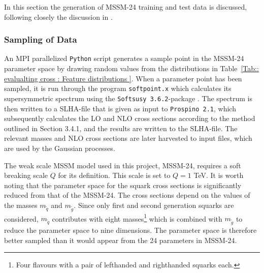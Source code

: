 \documentclass[twoside,english]{uiofysmaster}
\begin{document}
{In this section the generation of MSSM-24 training and test data is discussed, following closely the discussion in \cite{sparre2018fast}. 

\subsubsection{Sampling of Data}

An MPI parallelized \verb|Python| script generates a sample point in the MSSM-24 parameter space by drawing random values from the distributions in Table~\ref{Tab:: evalualting cross : Feature distributions }. When a parameter point has been sampled, it is run through the program \verb|softpoint.x| which calculates its supersymmetric spectrum using the \verb|Softsusy 3.6.2|-package \cite{ALLANACH2002305}. The spectrum is then written to a SLHA-file \cite{skands2004susy} that is given as input to \verb|Prospino 2.1|, which subsequently calculates the LO and NLO cross sections according to the method outlined in Section 3.4.1, and the results are written to the SLHA-file. The relevant masses and NLO cross sections are later harvested to input files, which are used by the Gaussian processes. 

The weak scale MSSM model used in this project, MSSM-24, requires a soft breaking scale $Q$ for its definition. This scale is set to $Q=1$ TeV. It is worth noting that the parameter space for the squark cross sections is significantly reduced from that of the MSSM-24. The cross sections depend on the values of the masses $m_{\widetilde{q}}$ and $m_{\widetilde{g}}$. Since only first and second generation squarks are considered, $m_{\widetilde{q}}$ contributes with eight masses\footnote{Four flavours with a pair of lefthanded and righthanded squarks each.} which is combined with $m_{\widetilde{g}}$ to reduce the parameter space to nine dimensions. The parameter space is therefore better sampled than it would appear from the 24 parameters in MSSM-24.

}
\end{document}
